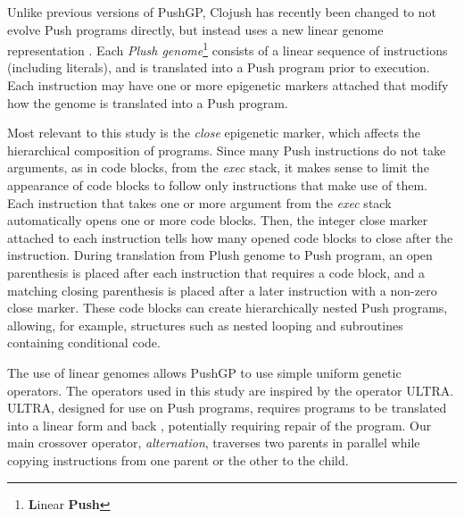 Unlike previous versions of PushGP, Clojush has recently been changed to not evolve 
Push programs directly, but instead uses a new linear genome representation 
\citep{Helmuth:2016:GPTP}. Each \textit{Plush genome}\footnote{\textbf{L}inear 
	\textbf{Push}} consists of a linear sequence of instructions (including 
literals), and is translated into a Push program prior to execution. Each 
instruction may have one or more epigenetic markers attached that modify how 
the genome is translated into a Push program.

Most relevant to this study is the \textit{close} epigenetic marker, which 
affects the hierarchical composition of programs. Since many Push instructions 
do not take arguments, as in code blocks, from the \textit{exec} stack, it 
makes sense to limit the appearance of code blocks to follow only instructions 
that make use of them. Each instruction that takes one or more argument from 
the \textit{exec} stack automatically opens one or more code blocks. Then, the 
integer close marker attached to each instruction tells how many opened code 
blocks to close after the instruction. During translation from Plush genome to 
Push program, an open parenthesis is placed after each instruction that 
requires a code block, and a matching closing parenthesis is placed after a 
later instruction with a non-zero close marker. These code blocks can create 
hierarchically nested Push programs, allowing, for example, structures such as 
nested looping and subroutines containing conditional code.

The use of linear genomes allows PushGP to use simple uniform genetic 
operators. The operators used in this study are inspired by the operator ULTRA. 
ULTRA, designed for use on Push programs, requires programs to be translated 
into a linear form and back \citep{Spector:2013:GPTP}, potentially requiring 
repair of the program. Our main crossover operator, \textit{alternation}, 
traverses two parents in parallel while copying instructions from one parent or 
the other to the child.


